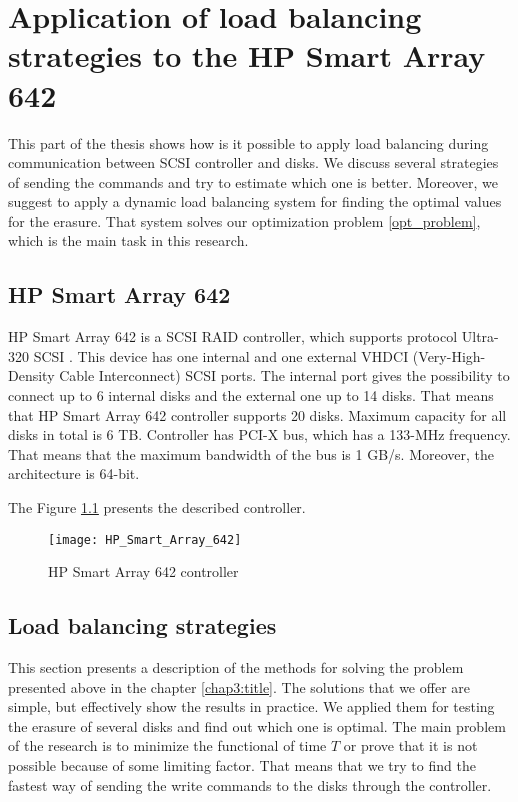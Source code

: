 \chapter{Application of load balancing strategies to the HP Smart Array 642}
\label{chap4:title}

This part of the thesis shows how is it possible to apply load balancing during communication between SCSI controller and disks. We discuss several strategies of sending the commands and try to estimate which one is better. Moreover, we suggest to apply a dynamic load balancing system for finding the optimal values for the erasure. That system solves our optimization problem \ref{opt_problem}, which is the main task in this research.

\section{HP Smart Array 642}
HP Smart Array 642 is a SCSI RAID controller, which supports protocol Ultra-320 SCSI \cite{hp_642_desc}. This device has one internal and one external VHDCI (Very-High-Density Cable Interconnect) SCSI ports. The internal port gives the possibility to connect up to 6 internal disks and the external one up to 14 disks. That means that HP Smart Array 642 controller supports 20 disks. Maximum capacity for all disks in total is 6 TB. Controller has PCI-X bus, which has a 133-MHz frequency. That means that the maximum bandwidth of the bus is 1 GB/s. Moreover, the architecture is 64-bit.

The Figure \ref{fig:HP_Smart_Array_642} presents the described controller.
\begin{figure}[h]
\begin{center}
  \texttt{[image: HP\_Smart\_Array\_642]}
\end{center}
  \caption{HP Smart Array 642 controller}
  \label{fig:HP_Smart_Array_642}
\end{figure}


\section{Load balancing strategies}
This section presents a description of the methods for solving the problem presented above in the chapter \ref{chap3:title}. The solutions that we offer are simple, but effectively show the results in practice. We applied them for testing the erasure of several disks and find out which one is optimal. The main problem of the research is to minimize the functional of time $T$ or prove that it is not possible because of some limiting factor. That means that we try to find the fastest way of sending the write commands to the disks through the controller.

